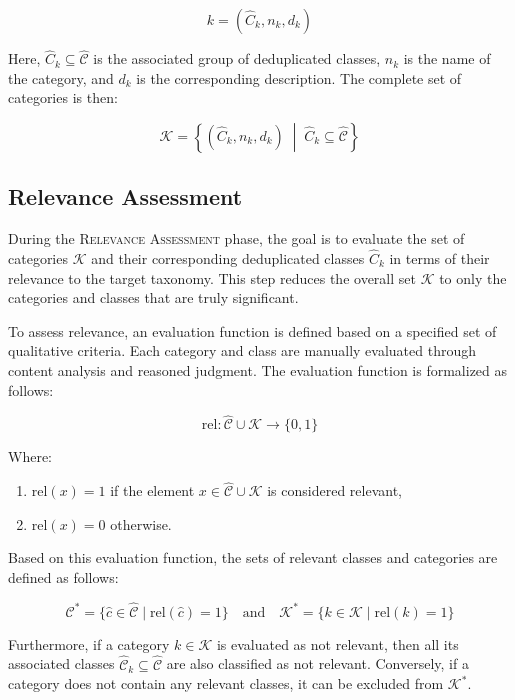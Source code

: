 \[
k = (\hat{C}_k, n_k, d_k)
\]

Here, $\hat{C}_k \subseteq \hat{\mathcal{C}}$ is the associated group of deduplicated classes, $n_k$ is the name of the category, and $d_k$ is the corresponding description. The complete set of categories is then:

\[
\mathcal{K} = \left\{ (\hat{C}_k, n_k, d_k) \;\middle|\; \hat{C}_k \subseteq \hat{\mathcal{C}} \right\}
\]

\subsection{Relevance Assessment}

During the \textsc{Relevance Assessment} phase, the goal is to evaluate the set of categories $\mathcal{K}$ and their corresponding deduplicated classes $\hat{C}_k$ in terms of their relevance to the target taxonomy. This step reduces the overall set $\mathcal{K}$ to only the categories and classes that are truly significant.

To assess relevance, an evaluation function is defined based on a specified set of qualitative criteria. Each category and class are manually evaluated through content analysis and reasoned judgment. The evaluation function is formalized as follows:

\[
\text{rel}: \hat{\mathcal{C}} \cup \mathcal{K} \rightarrow \{0, 1\}
\]

Where: 
\begin{enumerate} 
    \item $\text{rel}(x) = 1$ if the element $x \in \hat{\mathcal{C}} \cup \mathcal{K}$ is considered relevant, 
    \item $\text{rel}(x) = 0$ otherwise. 
\end{enumerate}

Based on this evaluation function, the sets of relevant classes and categories are defined as follows:

\[
\mathcal{C}^\ast = \{ \hat{c} \in \hat{\mathcal{C}} \mid \text{rel}(\hat{c}) = 1 \}
\quad \text{and} \quad
\mathcal{K}^\ast = \{ k \in \mathcal{K} \mid \text{rel}(k) = 1 \}
\]

Furthermore, if a category $k \in \mathcal{K}$ is evaluated as not relevant, then all its associated classes $\hat{\mathcal{C}}_k \subseteq \hat{\mathcal{C}}$ are also classified as not relevant. Conversely, if a category does not contain any relevant classes, it can be excluded from $\mathcal{K}^\ast$.

 
